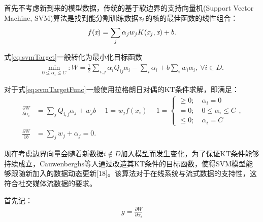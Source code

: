 \documentclass[UTF8]{csoarticle}
\begin{document}
首先不考虑新到来的模型数据，传统的基于软边界的支持向量机(Support Vector Machine, SVM)算法是找到能分割训练数据$\emph{x}_j$的核的最佳函数的线性组合：
\begin{align}\label{eq:svmTarget}
f(\emph{x})=\sum_j{\alpha_j w_j K(\emph{x}_j,\emph{x})}+b.
\end{align}

式\eqref{eq:svmTarget}一般转化为最小化目标函数
\begin{align}\label{eq:svmTargetFunc}
\mathop{min}\limits_{0\leq \alpha_i\leq C}:W = \frac{1}{2} \sum_{i,j}{\alpha_i Q_{ij} \alpha_i }-\sum_i{\alpha_i} +b\sum_i{w_i \alpha_i},\ \forall i \in D.
\end{align}

对于式\eqref{eq:svmTargetFunc}一般使用拉格朗日对偶的KT条件求解，即满足：
\begin{align}\label{eq:KT}
\frac{\partial{W}}{\partial{\alpha_i}}&=\sum_j{Q_{i,j}\alpha_j + w_jb-1=w_jf(x_i)-1=\begin{cases}\geq 0; \quad \alpha_i=0\\ = 0; \quad 0\le\alpha_i\le C \\ \leq 0;\quad \alpha_i =C \end{cases}},\\ \frac{\partial{W}}{\partial{b}} &= \sum_j{w_j} + \alpha_j = 0.
\end{align}

现在考虑边界向量会随着新数据$i\notin D$加入模型而发生变化，为了保证KT条件能够持续成立，Cauwenberghs等人通过改造其KT条件的目标函数，使得SVM模型能够跟随新加入的数据动态更新[18]。该算法对于在线系统与流式数据的支持性，这符合社交媒体流数据的要求。

首先记：
\begin{align}\label{eq:variableg}
g=\frac{\partial{W}}{\partial{\alpha_i}}
\end{align}
\end{document}
